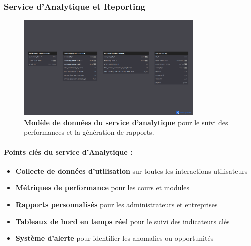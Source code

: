 \subsubsection{Service d'Analytique et Reporting}
\begin{figure}[p]
  \centering
  \includegraphics[width=0.8\textwidth,keepaspectratio]{week_1_img/services_db_screanshots/Screenshot 2025-06-06 at 15-04-59 Analytics_and_Reporting_Service.pdf.png}
  \caption{\textbf{Modèle de données du service d'analytique} pour le suivi des performances et la génération de rapports.}
  \label{fig:analytics_service}
\end{figure}

\vspace{5pt}
\small
\paragraph{Points clés du service d'Analytique :}
\begin{itemize}[leftmargin=*,noitemsep,topsep=0pt]
  \item \textbf{Collecte de données d'utilisation} sur toutes les interactions utilisateurs
  \item \textbf{Métriques de performance} pour les cours et modules
  \item \textbf{Rapports personnalisés} pour les administrateurs et entreprises
  \item \textbf{Tableaux de bord en temps réel} pour le suivi des indicateurs clés
  \item \textbf{Système d'alerte} pour identifier les anomalies ou opportunités
\end{itemize}
\normalsize
\clearpage

